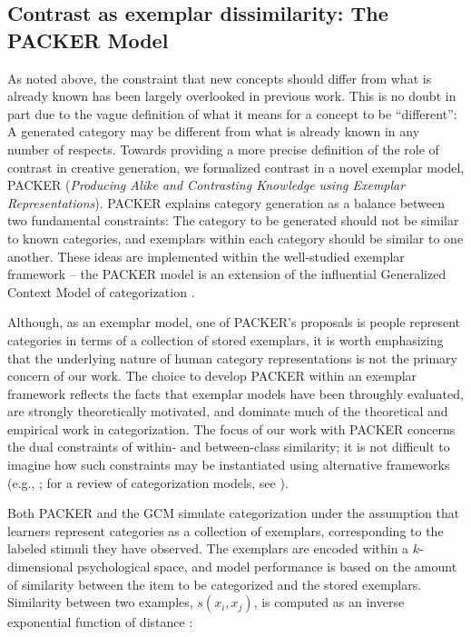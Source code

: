 \documentclass[12pt]{article}
\begin{document}
\begin{flushleft}
\subsection{Contrast as exemplar dissimilarity: The PACKER Model}

\label{section:PACKER-definition}

As noted above, the constraint that new concepts should differ from what is
already known has been largely overlooked in previous work. This is no doubt in
part due to the vague definition of what it means for a concept to be
``different'': A generated category may be different from what is already known
in any number of respects. Towards providing a more precise definition of the
role of contrast in creative generation, we formalized contrast in a novel
exemplar model, PACKER ({\em Producing Alike and Contrasting Knowledge using
Exemplar Representations}). PACKER explains category generation as a balance
between two fundamental constraints: The category to be generated should not be
similar to known categories, and exemplars within each category should be
similar to one another. These ideas are implemented within the well-studied
exemplar framework -- the PACKER model is an extension of the influential
Generalized Context Model of categorization
\citep[GCM;][]{nosofsky1984choice,nosofsky1986attention}.

Although, as an exemplar model, one of PACKER's proposals is people represent
categories in terms of a collection of stored exemplars, it is worth emphasizing
that the underlying nature of human category representations is not the primary
concern of our work. The choice to develop PACKER within an exemplar framework
reflects the facts that exemplar models have been throughly evaluated, are
strongly theoretically motivated, and dominate much of the theoretical and
empirical work in categorization. The focus of our work with PACKER concerns the
dual constraints of within- and between-class similarity; it is not difficult to
imagine how such constraints may be instantiated using alternative frameworks
(e.g., \citealp{kurtz2007divergent,love2004sustain,smith2000thirty}; for a
review of categorization models, see \citealp{pothoswills2011}).

Both PACKER and the GCM simulate categorization under the assumption that
learners represent categories as a collection of exemplars, corresponding to the
labeled stimuli they have observed. The exemplars are encoded within a
$k$-dimensional psychological space, and model performance is based on the
amount of similarity between the item to be categorized and the stored
exemplars. Similarity between two examples, $s\left(x_i, x_j\right)$, is
computed as an inverse exponential function of distance
\citep[following][]{attneave1950,shepard1957stimulus,shepard1987toward}:


\end{flushleft}
\end{document}
